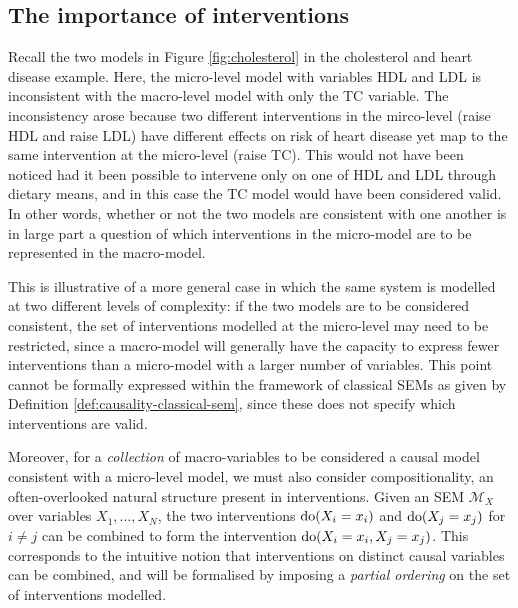 
\subsection{The importance of interventions}

Recall the two models in Figure \ref{fig:cholesterol} in the cholesterol and heart disease example. 
Here, the micro-level model with variables HDL and LDL is inconsistent with the macro-level model with only the TC variable. 
The inconsistency arose because two different interventions in the mirco-level (raise HDL and raise LDL) have different effects on risk of heart disease yet map to the same intervention at the micro-level (raise TC).
This would not have been noticed had it been possible to intervene only on one of HDL and LDL through dietary means, and in this case the TC model would have been considered valid.
In other words, whether or not the two models are consistent with one another is in large part a question of which interventions in the micro-model are to be represented in the macro-model.

This is illustrative of a more general case in which the same system is modelled at two different levels of complexity: if the two models are to be considered consistent, the set of interventions modelled at the micro-level may need to be restricted, since a macro-model will generally have the capacity to express fewer interventions than a micro-model with a larger number of variables. 
This point cannot be formally expressed within the framework of classical SEMs as given by Definition \ref{def:causality-classical-sem}, since these does not specify which interventions are valid. 

Moreover, for a \emph{collection} of macro-variables to be considered a causal model consistent with a micro-level model, we must also consider compositionality, an often-overlooked natural structure present in interventions.
Given an SEM $\mathcal{M}_X$ over variables $X_1, \ldots, X_N$, the two interventions $\operatorname{do}(X_i=x_i)$ and $\operatorname{do}(X_j=x_j)$ for $i\not=j$  can be combined to form the intervention $\operatorname{do}(X_i=x_i, X_j=x_j)$. 
This corresponds to the intuitive notion that interventions on distinct causal variables can be combined, and will be formalised by imposing a \emph{partial ordering} on the set of interventions modelled.

